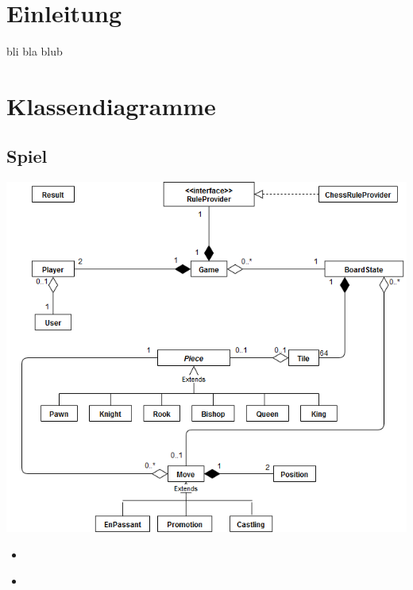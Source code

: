 \documentclass[parskip=full]{scrartcl}
\begin{document}
	\section{Einleitung}
		bli bla blub
	\section{Klassendiagramme}
	
		\subsection{Spiel}
		
		\begin{minipage}{\linewidth}
			\centering
			\includegraphics[width=1\linewidth]{Diagramme/TotalGame}
			\label{fig:totalGame}
		\end{minipage}
		\begin{itemize}
			\item
				\begin{description}
				
				\end{description}
			\item
				\begin{description}
				
				\end{description}
		\end{itemize}
		\newpage
		
\end{document}
